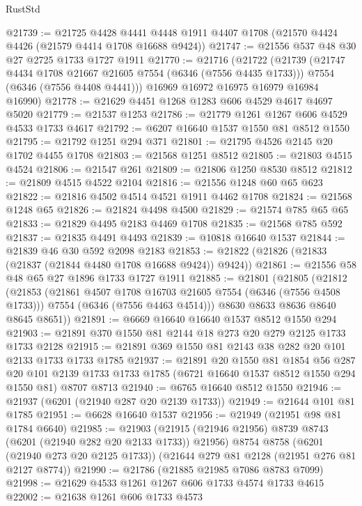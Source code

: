 \begin{lexlean}{RustStd}
\begin{coremodule}
@21739 := @21725
    @4428
    @4441
    @4448
    @1911
    @4407
    @1708
    (@21570 @4424 @4426 (@21579 @4414 @1708 @16688 @9424))
@21747 := @21556 @537 @48 @30 @27 @2725 @1733 @1727 @1911
@21770 := @21716
    (@21722
      (@21739
        (@21747 @4434 @1708 @21667 @21605 @7554 (@6346 (@7556 @4435 @1733)))
        @7554
        (@6346 (@7556 @4408 @4441)))
      @16969
      @16972
      @16975
      @16979
      @16984
      @16990)
@21778 := @21629 @4451 @1268 @1283 @606 @4529 @4617 @4697 @5020
@21779 := @21537 @1253
@21786 := @21779 @1261 @1267 @606 @4529 @4533 @1733 @4617
@21792 := @6207 @16640 @1537 @1550 @81 @8512 @1550
@21795 := @21792 @1251 @294 @371
@21801 := @21795 @4526 @2145 @20 @1702 @4455 @1708
@21803 := @21568 @1251 @8512
@21805 := @21803 @4515 @4524
@21806 := @21547 @261
@21809 := @21806 @1250 @8530 @8512
@21812 := @21809 @4515 @4522 @2104
@21816 := @21556 @1248 @60 @65 @623
@21822 := @21816 @4502 @4514 @4521 @1911 @4462 @1708
@21824 := @21568 @1248 @65
@21826 := @21824 @4498 @4500
@21829 := @21574 @785 @65 @65
@21833 := @21829 @4495 @2183 @4469 @1708
@21835 := @21568 @785 @592
@21837 := @21835 @4491 @4493
@21839 := @10818 @16640 @1537
@21844 := @21839 @46 @30 @592 @2098 @2183
@21853 := @21822 (@21826 (@21833 (@21837 (@21844 @4480 @1708 @16688 @9424)) @9424))
@21861 := @21556 @58 @48 @65 @27 @1896 @1733 @1727 @1911
@21885 := @21801
    (@21805
      (@21812
        (@21853
          (@21861 @4507 @1708 @16703 @21605 @7554 (@6346 (@7556 @4508 @1733)))
          @7554
          (@6346 (@7556 @4463 @4514)))
        @8630
        @8633
        @8636
        @8640
        @8645
        @8651))
@21891 := @6669 @16640 @16640 @1537 @8512 @1550 @294
@21903 := @21891 @370 @1550 @81 @2144 @18 @273 @20 @279 @2125 @1733 @1733 @2128
@21915 := @21891 @369 @1550 @81 @2143 @38 @282 @20 @101 @2133 @1733 @1733 @1785
@21937 := @21891
    @20
    @1550
    @81
    @1854
    @56
    @287
    @20
    @101
    @2139
    @1733
    @1733
    @1785
    (@6721 @16640 @1537 @8512 @1550 @294 @1550 @81)
    @8707
    @8713
@21940 := @6765 @16640 @8512 @1550
@21946 := @21937 (@6201 (@21940 @287 @20 @2139 @1733))
@21949 := @21644 @101 @81 @1785
@21951 := @6628 @16640 @1537
@21956 := @21949 (@21951 @98 @81 @1784 @6640)
@21985 := @21903
    (@21915 (@21946 @21956) @8739 @8743 (@6201 (@21940 @282 @20 @2133 @1733)) @21956)
    @8754
    @8758
    (@6201 (@21940 @273 @20 @2125 @1733))
    (@21644 @279 @81 @2128 (@21951 @276 @81 @2127 @8774))
@21990 := @21786 (@21885 @21985 @7086 @8783 @7099)
@21998 := @21629 @4533 @1261 @1267 @606 @1733 @4574 @1733 @4615
@22002 := @21638 @1261 @606 @1733 @4573

\end{coremodule}
\end{lexlean}
